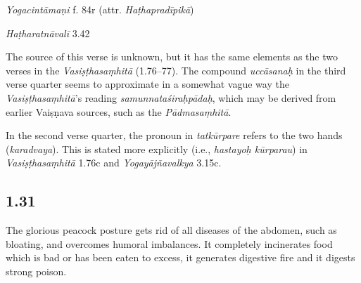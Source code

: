\begin{ekdosis}
\begin{sources}[hp01_030]
\end{sources}

\begin{testimonia}[hp01_030]
\emph{Yogacintāmaṇi} f. 84r (attr. \emph{Haṭhapradīpikā})

\begin{versinnote}
\end{versinnote}

\emph{Haṭharatnāvalī} 3.42

\begin{versinnote}
\end{versinnote}

\end{testimonia}

\begin{philcomm}[hp01_030]
The source of this verse is unknown, but it has the same elements as the two verses in the \emph{Vasiṣṭhasaṃhitā} (1.76–77). The compound \emph{uccāsanaḥ} in the third verse quarter seems to approximate in a somewhat vague way the \emph{Vasiṣṭhasaṃhitā}’s reading \emph{samunnataśiraḥpādaḥ}, which may be derived from earlier Vaiṣṇava sources, such as the \textit{Pādmasaṃhitā}. 
 
In the second verse quarter, the pronoun in \emph{tatkūrpare} refers to the two hands (\emph{karadvaya}). This is stated more explicitly (i.e., \emph{hastayoḥ kūrparau}) in \emph{Vasiṣṭhasaṃhitā} 1.76c and \emph{Yogayājñavalkya} 3.15c.
\end{philcomm}

\subsection*{1.31}
\begin{translation}[hp01_031]
The glorious peacock posture gets rid of all diseases of the abdomen, such as bloating, and overcomes humoral imbalances. It completely incinerates food which is bad or has been eaten to excess, it generates digestive fire and it digests strong poison.
\end{translation}


\end{ekdosis}
